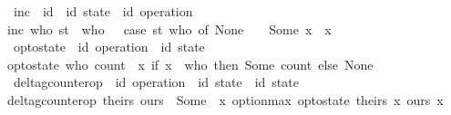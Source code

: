 \begin{isabellebody}
\isamarkupfalse%
\ inc\ {\isacharcolon}{\isacharcolon}\ {\isachardoublequoteopen}{\isacharprime}id\ {\isasymRightarrow}\ {\isacharparenleft}{\isacharprime}id\ state{\isacharparenright}\ {\isasymRightarrow}\ {\isacharparenleft}{\isacharprime}id\ operation{\isacharparenright}{\isachardoublequoteclose}\ \isanewline
{\isachardoublequoteopen}inc\ who\ st\ {\isacharequal}\ {\isacharparenleft}who{\isacharcomma}\ {\isacharparenleft}{}\ {\isacharplus}\ {\isacharparenleft}case\ {\isacharparenleft}st\ who{\isacharparenright}\ of\ None\ {\isasymRightarrow}\ {}\ {\isacharbar}\ Some\ {\isacharparenleft}x{\isacharparenright}\ {\isasymRightarrow}\ x{\isacharparenright}{\isacharparenright}{\isacharparenright}{\isachardoublequoteclose}\isanewline
\isanewline
{}\isamarkupfalse%
\ op{\isacharunderscore}to{\isacharunderscore}state\ {\isacharcolon}{\isacharcolon}\ {\isachardoublequoteopen}{\isacharparenleft}{\isacharprime}id\ operation{\isacharparenright}\ {\isasymRightarrow}\ {\isacharparenleft}{\isacharprime}id\ state{\isacharparenright}{\isachardoublequoteclose}\ \isanewline
{\isachardoublequoteopen}op{\isacharunderscore}to{\isacharunderscore}state\ {\isacharparenleft}who{\isacharcomma}\ count{\isacharparenright}\ {\isacharequal}\ {\isacharparenleft}{\isasymlambda}x{\isachardot}\ if\ x\ {\isacharequal}\ who\ then\ Some\ count\ else\ None{\isacharparenright}{\isachardoublequoteclose}\isanewline
\isanewline
{}\isamarkupfalse%
\ delta{\isacharunderscore}gcounter{\isacharunderscore}op\ {\isacharcolon}{\isacharcolon}\ {\isachardoublequoteopen}{\isacharparenleft}{\isacharprime}id\ operation{\isacharparenright}\ {\isasymRightarrow}\ {\isacharparenleft}{\isacharprime}id\ state{\isacharparenright}\ {\isasymrightharpoonup}\ {\isacharparenleft}{\isacharprime}id\ state{\isacharparenright}{\isachardoublequoteclose}\ \isanewline
{\isachardoublequoteopen}delta{\isacharunderscore}gcounter{\isacharunderscore}op\ theirs\ ours\ {\isacharequal}\ Some\ {\isacharparenleft}{\isasymlambda}\ x{\isachardot}\ option{\isacharunderscore}max\ {\isacharparenleft}{\isacharparenleft}op{\isacharunderscore}to{\isacharunderscore}state\ theirs{\isacharparenright}\ x{\isacharparenright}\ {\isacharparenleft}ours\ x{\isacharparenright}{\isacharparenright}{\isachardoublequoteclose}
\end{isabellebody}

